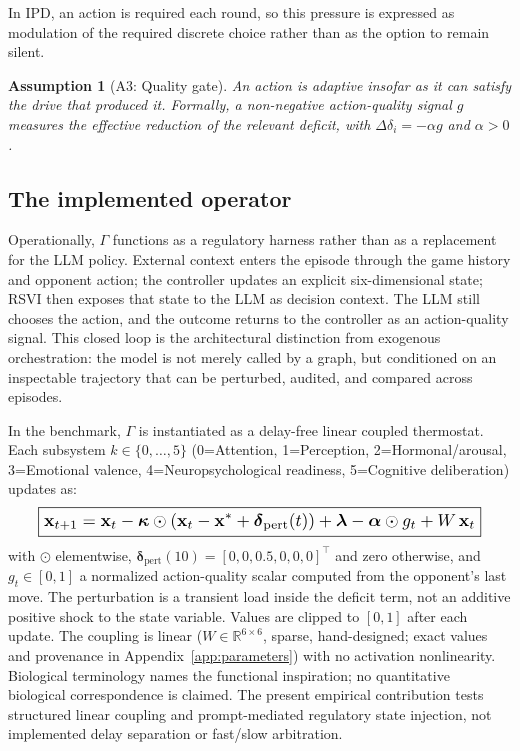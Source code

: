 \documentclass{article}
\newtheorem{assumption}{Assumption}[section]
\begin{document}
In IPD, an action is required each round, so this pressure is expressed as modulation of the required discrete choice rather than as the option to remain silent.

\begin{assumption}[A3: Quality gate]
An action is adaptive insofar as it can satisfy the drive that produced it. Formally, a non-negative action-quality signal $g$ measures the effective reduction of the relevant deficit, with $\Delta\delta_i=-\alpha g$ and $\alpha>0$.
\end{assumption}

\subsection{The implemented operator}

Operationally, $\Gamma$ functions as a regulatory harness rather than as a replacement for the LLM policy. External context enters the episode through the game history and opponent action; the controller updates an explicit six-dimensional state; RSVI then exposes that state to the LLM as decision context. The LLM still chooses the action, and the outcome returns to the controller as an action-quality signal. This closed loop is the architectural distinction from exogenous orchestration: the model is not merely called by a graph, but conditioned on an inspectable trajectory that can be perturbed, audited, and compared across episodes.

In the benchmark, $\Gamma$ is instantiated as a delay-free linear coupled thermostat. Each subsystem $k \in \{0,\dots,5\}$ (0=Attention, 1=Perception, 2=Hormonal/arousal, 3=Emotional valence, 4=Neuropsychological readiness, 5=Cognitive deliberation) updates as:
\begin{equation}\label{eq:master}
\resizebox{.92\columnwidth}{!}{$\boxed{\mathbf{x}_{t+1} = \mathbf{x}_t - \boldsymbol{\kappa} \odot (\mathbf{x}_t - \mathbf{x}^{*} + \boldsymbol{\delta}_{\text{pert}}(t)) + \boldsymbol{\lambda} - \boldsymbol{\alpha} \odot g_t + W\,\mathbf{x}_t}$}
\end{equation}
with $\odot$ elementwise, $\boldsymbol{\delta}_{\text{pert}}(10) = [0,0,0.5,0,0,0]^\top$ and zero otherwise, and $g_t \in [0,1]$ a normalized action-quality scalar computed from the opponent's last move. The perturbation is a transient load inside the deficit term, not an additive positive shock to the state variable. Values are clipped to $[0,1]$ after each update. The coupling is linear ($W \in \mathbb{R}^{6\times 6}$, sparse, hand-designed; exact values and provenance in Appendix~\ref{app:parameters}) with no activation nonlinearity. Biological terminology names the functional inspiration; no quantitative biological correspondence is claimed. The present empirical contribution tests structured linear coupling and prompt-mediated regulatory state injection, not implemented delay separation or fast/slow arbitration.
\end{document}
